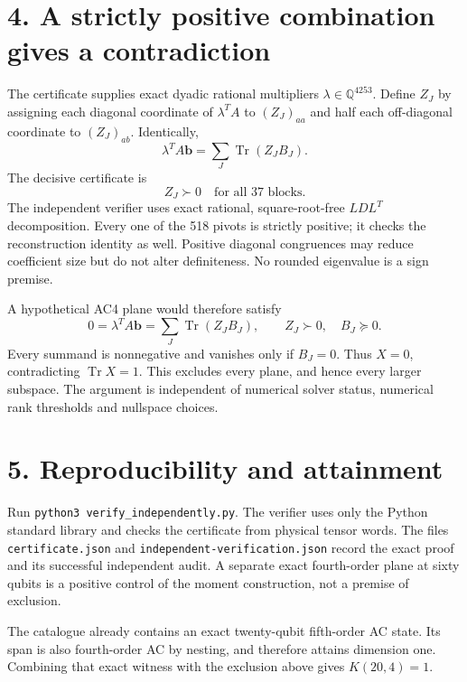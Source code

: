 \documentclass[11pt]{article}
\newcommand{\Tr}{\operatorname{Tr}}\newcommand{\Sym}{\operatorname{Sym}}
\begin{document}
\section*{4. A strictly positive combination gives a contradiction}
The certificate supplies exact dyadic rational multipliers $\lambda\in\mathbb Q^{4253}$. Define $Z_J$ by assigning each diagonal coordinate of $\lambda^TA$ to $(Z_J)_{aa}$ and half each off-diagonal coordinate to $(Z_J)_{ab}$. Identically,
\[\lambda^TA\mathbf b=\sum_J\Tr(Z_JB_J).\]
The decisive certificate is
\[\boxed{Z_J\succ0\quad\text{for all 37 blocks}.}\]
The independent verifier uses exact rational, square-root-free $LDL^T$ decomposition. Every one of the 518 pivots is strictly positive; it checks the reconstruction identity as well. Positive diagonal congruences may reduce coefficient size but do not alter definiteness. No rounded eigenvalue is a sign premise.

A hypothetical AC4 plane would therefore satisfy
\[0=\lambda^TA\mathbf b=\sum_J\Tr(Z_JB_J),\qquad Z_J\succ0,\quad B_J\succeq0.\]
Every summand is nonnegative and vanishes only if $B_J=0$. Thus $X=0$, contradicting $\Tr X=1$. This excludes every plane, and hence every larger subspace. The argument is independent of numerical solver status, numerical rank thresholds and nullspace choices.

\section*{5. Reproducibility and attainment}
Run \texttt{python3 verify\_independently.py}. The verifier uses only the Python standard library and checks the certificate from physical tensor words. The files \texttt{certificate.json} and \texttt{independent-verification.json} record the exact proof and its successful independent audit. A separate exact fourth-order plane at sixty qubits is a positive control of the moment construction, not a premise of exclusion.

The catalogue already contains an exact twenty-qubit fifth-order AC state. Its span is also fourth-order AC by nesting, and therefore attains dimension one. Combining that exact witness with the exclusion above gives $K(20,4)=1$.
\end{document}
